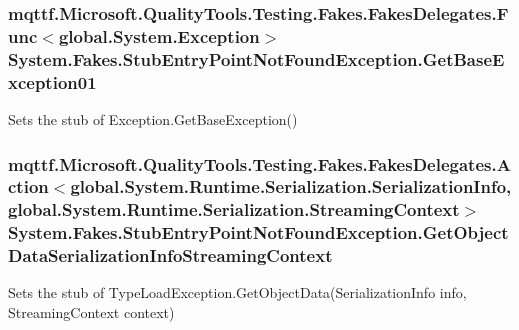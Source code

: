 \hypertarget{class_system_1_1_fakes_1_1_stub_entry_point_not_found_exception_ac2abb0da0214933a65ec4fe797e85539}{
\subsubsection[{Get\-Base\-Exception01}]{\setlength{\rightskip}{0pt plus 5cm}mqttf.\-Microsoft.\-Quality\-Tools.\-Testing.\-Fakes.\-Fakes\-Delegates.\-Func$<$global.\-System.\-Exception$>$ System.\-Fakes.\-Stub\-Entry\-Point\-Not\-Found\-Exception.\-Get\-Base\-Exception01}}\label{class_system_1_1_fakes_1_1_stub_entry_point_not_found_exception_ac2abb0da0214933a65ec4fe797e85539}


Sets the stub of Exception.\-Get\-Base\-Exception()

\hypertarget{class_system_1_1_fakes_1_1_stub_entry_point_not_found_exception_a56a382c0c9b5411bd21aa4a1d757f438}{
\subsubsection[{Get\-Object\-Data\-Serialization\-Info\-Streaming\-Context}]{\setlength{\rightskip}{0pt plus 5cm}mqttf.\-Microsoft.\-Quality\-Tools.\-Testing.\-Fakes.\-Fakes\-Delegates.\-Action$<$global.\-System.\-Runtime.\-Serialization.\-Serialization\-Info, global.\-System.\-Runtime.\-Serialization.\-Streaming\-Context$>$ System.\-Fakes.\-Stub\-Entry\-Point\-Not\-Found\-Exception.\-Get\-Object\-Data\-Serialization\-Info\-Streaming\-Context}}\label{class_system_1_1_fakes_1_1_stub_entry_point_not_found_exception_a56a382c0c9b5411bd21aa4a1d757f438}


Sets the stub of Type\-Load\-Exception.\-Get\-Object\-Data(\-Serialization\-Info info, Streaming\-Context context)

